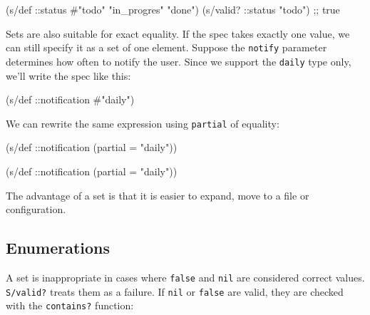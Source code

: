 \else

\begin{english}
  \begin{clojure}
(s/def ::status #{"todo" "in_progres" "done"})
(s/valid? ::status "todo") ;; true
  \end{clojure}
\end{english}

\fi

Sets are also suitable for exact equality. If the spec takes exactly one value, we can still specify it as a set of one element. Suppose the \verb|notify| parameter determines how often to notify the user. Since we support the \verb|daily| type only, we'll write the spec like this:

\begin{english}
  \begin{clojure}
(s/def ::notification #{"daily"})
  \end{clojure}
\end{english}

\noindent
We can rewrite the same expression using \verb|partial| of equality:

\ifx\DEVICETYPE\MOBILE

\begin{english}
  \begin{clojure}
(s/def ::notification
  (partial = "daily"))
  \end{clojure}
\end{english}

\else

\begin{english}
  \begin{clojure}
(s/def ::notification (partial = "daily"))
  \end{clojure}
\end{english}

\fi

The advantage of a set is that it is easier to expand, move to a file or configuration.

\subsection{Enumerations}


A set is inappropriate in cases where \verb|false| and \verb|nil| are considered correct values. \verb|S/valid?| treats them as a failure. If \verb|nil| or \verb|false| are valid, they are checked with the \verb|contains?| function:

